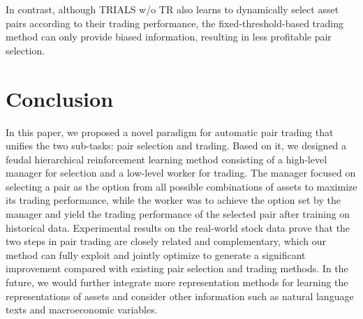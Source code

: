 \documentclass[sigconf]{acmart}
\begin{document}
In contrast, although TRIALS w/o TR also learns to dynamically select asset pairs according to their trading performance, the fixed-threshold-based trading method can only provide biased information, resulting in less profitable pair selection.

\section{Conclusion}
In this paper, we proposed a novel paradigm for automatic pair trading that unifies the two sub-tasks: pair selection and trading.
Based on it, we designed a feudal hierarchical reinforcement learning method consisting of a high-level manager for selection and a low-level worker for trading.
The manager focused on selecting a pair as the option from all possible combinations of assets to maximize its trading performance, while the worker was to achieve the option set by the manager and yield the trading performance of the selected pair after training on historical data.
Experimental results on the real-world stock data prove that the two steps in pair trading are closely related and complementary, which our method can fully exploit and jointly optimize to generate a significant improvement compared with existing pair selection and trading methods.
In the future, we would further integrate more representation methods for learning the representations of assets and consider other information such as natural language texts and macroeconomic variables.





\appendix
\end{document}
